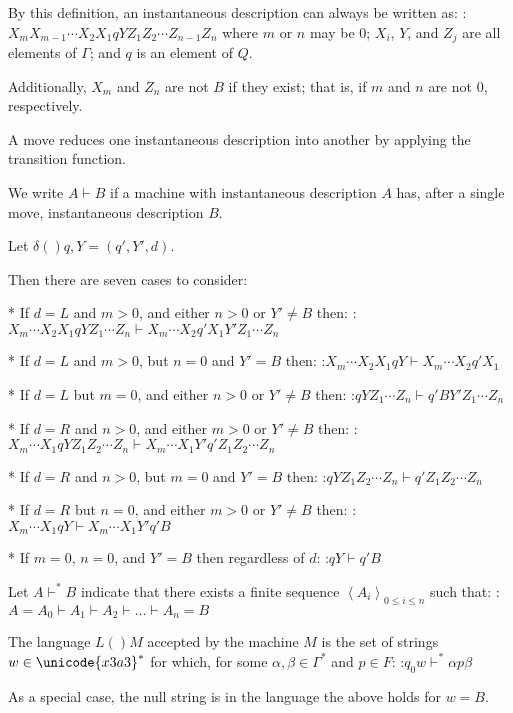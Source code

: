 By this definition, an instantaneous description can always be written as:
:$X_m X_{m-1} \dotsm X_2 X_1 q Y Z_1 Z_2 \dotsm Z_{n-1} Z_n$
where $m$ or $n$ may be $0$; $X_i$, $Y$, and $Z_j$ are all elements of $\Gamma$; and $q$ is an element of $Q$.

Additionally, $X_m$ and $Z_n$ are not $B$ if they exist; that is, if $m$ and $n$ are not $0$, respectively.


A move reduces one instantaneous description into another by applying the transition function.

We write $A \vdash B$ if a machine with instantaneous description $A$ has, after a single move, instantaneous description $B$.

Let $\delta \left(   \right){q, Y} = \left( q', Y', d \right)$.

Then there are seven cases to consider:

* If $d = L$ and $m > 0$, and either $n > 0$ or $Y' \neq B$ then:
:$X_m \dotsm X_2 X_1 q Y Z_1 \dotsm Z_n \vdash X_m \dotsm X_2 q' X_1 Y' Z_1 \dotsm Z_n$

* If $d = L$ and $m > 0$, but $n = 0$ and $Y' = B$ then:
:$X_m \dotsm X_2 X_1 q Y \vdash X_m \dotsm X_2 q' X_1$

* If $d = L$ but $m = 0$, and either $n > 0$ or $Y' \neq B$ then:
:$q Y Z_1 \dotsm Z_n \vdash q' B Y' Z_1 \dotsm Z_n$

* If $d = R$ and $n > 0$, and either $m > 0$ or $Y' \neq B$ then:
:$X_m \dotsm X_1 q Y Z_1 Z_2 \dotsm Z_n \vdash X_m \dotsm X_1 Y' q' Z_1 Z_2 \dotsm Z_n$

* If $d = R$ and $n > 0$, but $m = 0$ and $Y' = B$ then:
:$q Y Z_1 Z_2 \dotsm Z_n \vdash q' Z_1 Z_2 \dotsm Z_n$

* If $d = R$ but $n = 0$, and either $m > 0$ or $Y' \neq B$ then:
:$X_m \dotsm X_1 q Y \vdash X_m \dotsm X_1 Y' q' B$

* If $m = 0$, $n = 0$, and $Y' = B$ then regardless of $d$:
:$q Y \vdash q' B$


Let $A \vdash^* B$ indicate that there exists a finite sequence $\left\langle A_i \right\rangle_{0 \leq i \leq n}$ such that:
:$A = A_0 \vdash A_1 \vdash A_2 \vdash \dotso \vdash A_n = B$


The language $L \left(   \right)M$ accepted by the machine $M$ is the set of strings $w \in \unicode{x3a3}^*$ for which, for some $\alpha, \beta \in \Gamma^*$ and $p \in F$:
:$q_0 w \vdash^* \alpha p \beta$

As a special case, the null string is in the language  the above holds for $w = B$.



